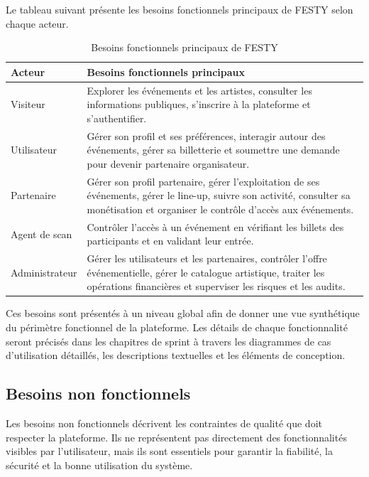 Le tableau suivant présente les besoins fonctionnels principaux de FESTY selon chaque acteur.


\begin{table}[H]
\centering
\caption{Besoins fonctionnels principaux de FESTY}
\label{tableau:2-2}
\renewcommand{\arraystretch}{1.2}
\begin{tabularx}{\textwidth}{|>{\raggedright\arraybackslash}X|>{\raggedright\arraybackslash}X|}
\hline
\rowcolor[HTML]{ECF4FF}
\textbf{Acteur} & \textbf{Besoins fonctionnels principaux} \\
\hline
Visiteur & Explorer les événements et les artistes, consulter les informations publiques, s’inscrire à la plateforme et s’authentifier. \\
\hline
Utilisateur & Gérer son profil et ses préférences, interagir autour des événements, gérer sa billetterie et soumettre une demande pour devenir partenaire organisateur. \\
\hline
Partenaire & Gérer son profil partenaire, gérer l’exploitation de ses événements, gérer le line-up, suivre son activité, consulter sa monétisation et organiser le contrôle d’accès aux événements. \\
\hline
Agent de scan & Contrôler l’accès à un événement en vérifiant les billets des participants et en validant leur entrée. \\
\hline
Administrateur & Gérer les utilisateurs et les partenaires, contrôler l’offre événementielle, gérer le catalogue artistique, traiter les opérations financières et superviser les risques et les audits. \\
\hline
\end{tabularx}
\end{table}


Ces besoins sont présentés à un niveau global afin de donner une vue synthétique du périmètre fonctionnel de la plateforme. Les détails de chaque fonctionnalité seront précisés dans les chapitres de sprint à travers les diagrammes de cas d’utilisation détaillés, les descriptions textuelles et les éléments de conception.


\subsection{Besoins non fonctionnels}


Les besoins non fonctionnels décrivent les contraintes de qualité que doit respecter la plateforme. Ils ne représentent pas directement des fonctionnalités visibles par l’utilisateur, mais ils sont essentiels pour garantir la fiabilité, la sécurité et la bonne utilisation du système.


